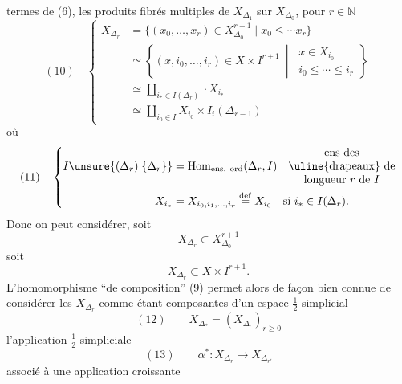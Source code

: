 termes de (6), les produits fibrés
multiples de $X_{\Delta_1}$ sur $X_{\Delta_0}$, pour $r\in\mathbb N$
\[
(10)\quad\left\{\begin{aligned}
X_{\Delta_r}&=\{(x_0,\ldots,x_r)\in X_{\Delta_0}^{r+1}\mid x_0\leq\cdots x_r\}\\
&\simeq\left\{(x,i_0,\ldots,i_r)\in X\times I^{r+1}\ \middle|\ \begin{matrix}x\in X_{i_0}\\i_0\leq\cdots\leq i_r\end{matrix}\right\}\\
&\simeq\coprod_{i_*\in I(\Delta_r)}\cdot X_{i_*}\\
&\simeq\coprod_{i_0\in I}X_{i_0}\times I_i(\Delta_{r-1})
\end{aligned}\right.
\]
où
\[
(11)\quad\left\{\begin{aligned}
I\unsure{(\Delta_r)|\{\Delta_r\}}&=\operatorname{Hom}_{\text{ens. ord}}(\Delta_r,I)
\quad\begin{matrix}\text{ens des}\\\text{\uline{drapeaux} de}\\\text{longueur }r\text{ de }I\end{matrix}\\
X_{i_*}&=X_{i_0,i_1,\ldots,i_r}\overset{\mathrm{def}}{=}X_{i_0}\quad\text{si }i_*\in I(\Delta_r).
\end{aligned}\right.
\]
Donc on peut considérer, soit
\[
X_{\Delta_r}\subset X_{\Delta_0}^{r+1}
\]
soit
\[
X_{\Delta_r}\subset X\times I^{r+1}.
\]
L'homomorphisme ``de composition'' (9)
permet alors de façon bien connue de
considérer les $X_{\Delta_r}$ comme étant 
composantes d'un espace $\frac12$ simplicial
\[
(12)\qquad X_{\Delta_*}=(X_{\Delta_r})_{r\geq0}
\]
 l'application $\frac12$ simpliciale
\[
(13)\qquad\alpha^*:X_{\Delta_r}\longrightarrow X_{\Delta_{r'}}
\]
associé à une application croissante
